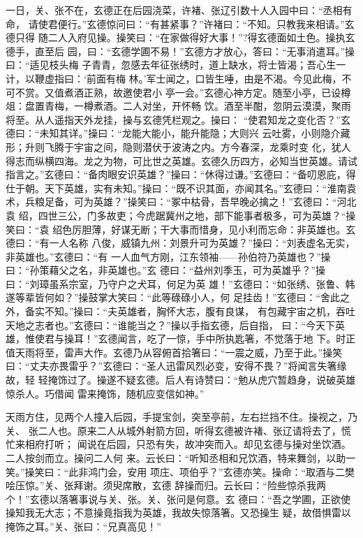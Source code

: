 一日，关、张不在，玄德正在后园浇菜，许褚、张辽引数十人入园中曰：“丞相有命，
请使君便行。”玄德惊问曰：“有甚紧事？”许褚曰：“不知。只教我来相请。”玄德只得
随二人入府见操。操笑曰：“在家做得好大事！”?得玄德面如土色。操执玄德手，直至后
园，曰：“玄德学圃不易！”玄德方才放心，答曰：“无事消遣耳。”操曰：“适见枝头梅
子青青，忽感去年征张绣时，道上缺水，将士皆渴；吾心生一计，以鞭虚指曰：‘前面有梅
林。’军士闻之，口皆生唾，由是不渴。今见此梅，不可不赏。又值煮酒正熟，故邀使君小
亭一会。”玄德心神方定。随至小亭，已设樽俎：盘置青梅，一樽煮酒。二人对坐，开怀畅
饮。酒至半酣，忽阴云漠漠，聚雨将至。从人遥指天外龙挂，操与玄德凭栏观之。操曰：
“使君知龙之变化否？”玄德曰：“未知其详。”操曰：“龙能大能小，能升能隐；大则兴
云吐雾，小则隐介藏形；升则飞腾于宇宙之间，隐则潜伏于波涛之内。方今春深，龙乘时变
化，犹人得志而纵横四海。龙之为物，可比世之英雄。玄德久历四方，必知当世英雄。请试
指言之。”玄德曰：“备肉眼安识英雄？”操曰：“休得过谦。”玄德曰：“备叨恩庇，得
仕于朝。天下英雄，实有未知。”操曰：“既不识其面，亦闻其名。”玄德曰：“淮南袁
术，兵粮足备，可为英雄？”操笑曰：“冢中枯骨，吾早晚必擒之！”玄德曰：“河北袁
绍，四世三公，门多故吏；今虎踞冀州之地，部下能事者极多，可为英雄？“操笑曰：“袁
绍色厉胆薄，好谋无断；干大事而惜身，见小利而忘命：非英雄也。玄德曰：“有一人名称
八俊，威镇九州：刘景升可为英雄？”操曰：“刘表虚名无实，非英雄也。”玄德曰：“有
一人血气方刚，江东领袖——孙伯符乃英雄也？”操曰：“孙策藉父之名，非英雄也。”玄
德曰：“益州刘季玉，可为英雄乎？”操曰：“刘璋虽系宗室，乃守户之犬耳，何足为英
雄！”玄德曰：“如张绣、张鲁、韩遂等辈皆何如？”操鼓掌大笑曰：“此等碌碌小人，何
足挂齿！”玄德曰：“舍此之外，备实不知。”操曰：“夫英雄者，胸怀大志，腹有良谋，
有包藏宇宙之机，吞吐天地之志者也。”玄德曰：“谁能当之？”操以手指玄德，后自指，
曰：“今天下英雄，惟使君与操耳！”玄德闻言，吃了一惊，手中所执匙箸，不觉落于地
下。时正值天雨将至，雷声大作。玄德乃从容俯首拾箸曰：“一震之威，乃至于此。”操笑
曰：“丈夫亦畏雷乎？”玄德曰：“圣人迅雷风烈必变，安得不畏？”将闻言失箸缘故，轻
轻掩饰过了。操遂不疑玄德。后人有诗赞曰：“勉从虎穴暂趋身，说破英雄惊杀人。巧借闻
雷来掩饰，随机应变信如神。”

天雨方住，见两个人撞入后园，手提宝剑，突至亭前，左右拦挡不住。操视之，乃关、
张二人也。原来二人从城外射箭方回，听得玄德被许褚、张辽请将去了，慌忙来相府打听；
闻说在后园，只恐有失，故冲突而入。却见玄德与操对坐饮酒。二人按剑而立。操问二人何
来。云长曰：“听知丞相和兄饮酒，特来舞剑，以助一笑。”操笑曰：“此非鸿门会，安用
项庄、项伯乎？”玄德亦笑。操命：“取酒与二樊哙压惊。”关、张拜谢。须臾席散，玄德
辞操而归。云长曰：“险些惊杀我两个！”玄德以落箸事说与关、张。关、张问是何意。玄
德曰：“吾之学圃，正欲使操知我无大志；不意操竟指我为英雄，我故失惊落箸。又恐操生
疑，故借惧雷以掩饰之耳。”关、张曰：“兄真高见！”

